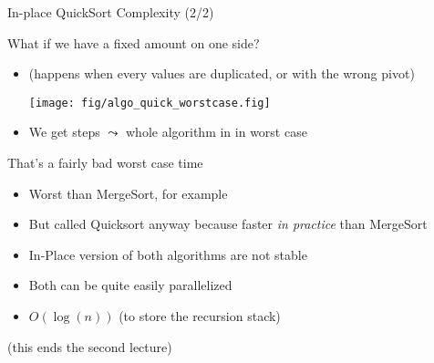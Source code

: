 \begin{frame}{In-place QuickSort Complexity (2/2)}
  \begin{block}{What if we have a fixed amount on one side?}
    \begin{itemize}
    \item (happens when every values are duplicated, or with the wrong pivot)

    \centerline{
      \texttt{[image: fig/algo\_quick\_worstcase.fig]}
    }
    \item We get  steps 
      $\leadsto$ whole algorithm in  in worst case
    \end{itemize}    
  \end{block}\vspace{-.4\baselineskip}

  \begin{block}{That's a fairly bad worst case time}
    \begin{itemize}
    \item Worst than MergeSort, for example
    \item But called Quicksort anyway because faster \textit{in practice}
      than MergeSort%
    \item In-Place version of both algorithms are \alert{not stable}
    \item Both can be quite easily parallelized
    \item {}
      $O(\log(n))$ (to store the recursion stack)
    \end{itemize}
  \end{block}\vspace{-\baselineskip}

  \begin{flushright}
    (this ends the second lecture)    
  \end{flushright}
\end{frame}

